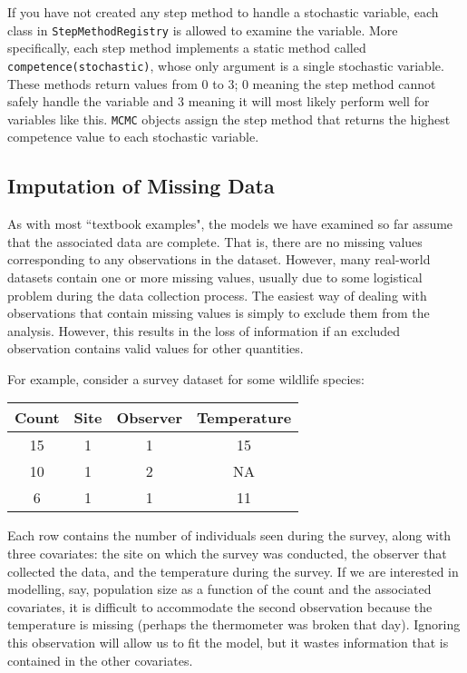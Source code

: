 If you have not created any step method to handle a stochastic variable, each class in \texttt{StepMethodRegistry} is allowed to examine the variable. More specifically, each step method implements a static method called \texttt{competence(stochastic)}, whose only argument is a single stochastic variable. These methods return values from 0 to 3; 0 meaning the step method cannot safely handle the variable and 3 meaning it will most likely perform well for variables like this. \texttt{MCMC} objects assign the step method that returns the highest competence value to each stochastic variable.

\subsection*{Imputation of Missing Data} %
\label{subsec:missing_data}

As with most ``textbook examples", the models we have examined so far assume that the associated data are complete. That is, there are no missing values corresponding to any observations in the dataset. However, many real-world datasets contain one or more missing values, usually due to some logistical problem during the data collection process. The easiest way of dealing with observations that contain missing values is simply to exclude them from the analysis. However, this results in the loss of information if an excluded observation contains valid values for other quantities. 

For example, consider a survey dataset for some wildlife species:

\begin{tabular}{cccc}
\hline
Count & Site & Observer & Temperature\\
\hline
15 & 1 & 1 & 15\\
10 & 1 & 2 & NA\\
6 & 1 & 1 & 11\\
\hline
\end{tabular}

Each row contains the number of individuals seen during the survey, along with three covariates: the site on which the survey was conducted, the observer that collected the data, and the temperature during the survey. If we are interested in modelling, say, population size as a function of the count and the associated covariates, it is difficult to accommodate the second observation because the temperature is missing (perhaps the thermometer was broken that day). Ignoring this observation will allow us to fit the model, but it wastes information that is contained in the other covariates. 


